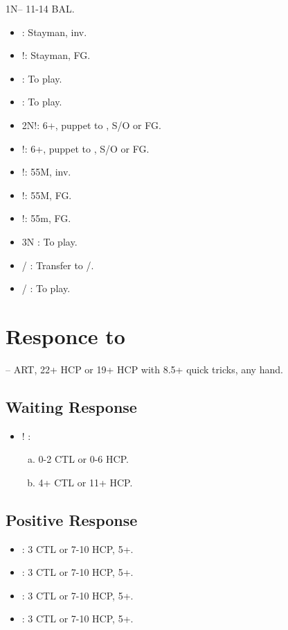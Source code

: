 \documentclass[12pt,twoside,a5paper]{report}%
\begin{document}
	1N-- 11-14 BAL.
	\begin{itemize}
	\renewcommand{\labelitemi}{}
	\item {} : Stayman, inv.
	\item {}!: Stayman, FG.
	\item {} : To play.
	\item {} : To play.
	\item 2N!: 6+\cl{}, puppet to , S/O or FG.
	\item {}!: 6+\di{}, puppet to , S/O or FG.
	\item {}!: 55M, inv.
	\item {}!: 55M, FG.
	\item {}!: 55m, FG.
	\item 3N : To play.
	\item {}/ : Transfer to /\sp{}.
	\item {}/ : To play.
	\end{itemize}

\chapter*{Responce to }
	-- ART, 22+ HCP or 19+ HCP with 8.5+ quick tricks, any hand.
	\section*{Waiting Response}
		\begin{itemize}
		\renewcommand{\labelitemi}{}
			\item {}! : 
				\begin{enumerate}[(a)]
				\item 0-2 CTL or 0-6 HCP.
				\item 4+ CTL or 11+ HCP.
				\end{enumerate}
		\end{itemize}
	\section*{Positive Response}
		\begin{itemize}
		\renewcommand{\labelitemi}{}
			\item {} : 3 CTL or 7-10 HCP, 5+\he{}.
			\item {} : 3 CTL or 7-10 HCP, 5+\sp{}.
			\item {} : 3 CTL or 7-10 HCP, 5+\cl{}.
			\item {} : 3 CTL or 7-10 HCP, 5+\di{}.
		\end{itemize}
\end{document}
